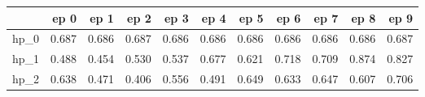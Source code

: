\begin{tabular}{lrrrrrrrrrr}
\toprule
{} &   ep 0 &   ep 1 &   ep 2 &   ep 3 &   ep 4 &   ep 5 &   ep 6 &   ep 7 &   ep 8 &   ep 9 \\
\midrule
hp\_0 &  0.687 &  0.686 &  0.687 &  0.686 &  0.686 &  0.686 &  0.686 &  0.686 &  0.686 &  0.687 \\
hp\_1 &  0.488 &  0.454 &  0.530 &  0.537 &  0.677 &  0.621 &  0.718 &  0.709 &  0.874 &  0.827 \\
hp\_2 &  0.638 &  0.471 &  0.406 &  0.556 &  0.491 &  0.649 &  0.633 &  0.647 &  0.607 &  0.706 \\
\bottomrule
\end{tabular}
